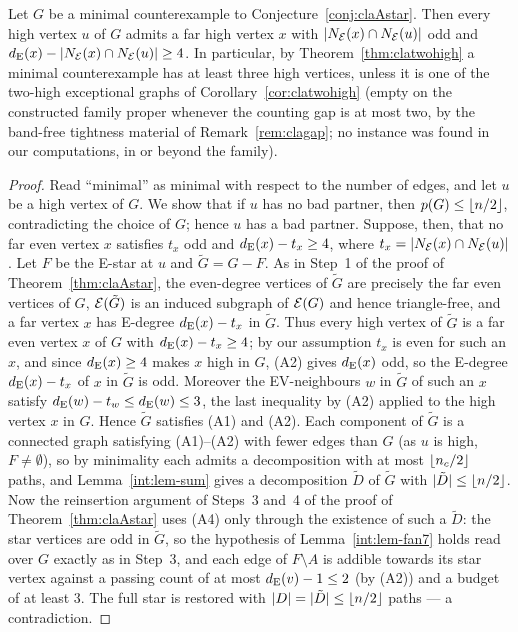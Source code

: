 \begin{proposition}\label{prop:claresidue}
Let $G$ be a minimal counterexample to Conjecture~\ref{conj:claAstar}.
Then every high vertex $u$ of $G$ admits a far high vertex $x$ with
$|N_{\mathcal{E}}(x)\cap N_{\mathcal{E}}(u)|$ odd and
$d_{\mathrm{E}}(x)-|N_{\mathcal{E}}(x)\cap N_{\mathcal{E}}(u)|\ge4$. In particular, by
Theorem~\ref{thm:clatwohigh} a minimal counterexample has at least three
high vertices, unless it is one of the two-high exceptional graphs of
Corollary~\ref{cor:clatwohigh} (empty on the constructed family proper
whenever the counting gap is at most two, by the band-free tightness
material of Remark~\ref{rem:clagap}; no instance was found in our
computations, in or beyond the family).
\end{proposition}
\begin{proof}
Read ``minimal'' as minimal with respect to the number of edges, and let
$u$ be a high vertex of $G$. We show that if $u$ has no bad partner, then
$p(G)\le\left\lfloor n/2 \right\rfloor$, contradicting the choice of $G$; hence $u$ has a
bad partner. Suppose, then, that no far even vertex $x$ satisfies $t_x$
odd and $d_{\mathrm{E}}(x)-t_x\ge4$, where $t_x=|N_{\mathcal{E}}(x)\cap N_{\mathcal{E}}(u)|$. Let
$F$ be the E-star at $u$ and $\tilde G=G-F$. As in Step~1 of the proof of
Theorem~\ref{thm:claAstar}, the even-degree vertices of $\tilde G$ are
precisely the far even vertices of $G$, $\mathcal{E}(\tilde G)$ is an induced
subgraph of $\mathcal{E}(G)$ and hence triangle-free, and a far vertex $x$ has
E-degree $d_{\mathrm{E}}(x)-t_x$ in $\tilde G$. Thus every high vertex of
$\tilde G$ is a far even vertex $x$ of $G$ with $d_{\mathrm{E}}(x)-t_x\ge4$; by our
assumption $t_x$ is even for such an $x$, and since $d_{\mathrm{E}}(x)\ge4$ makes
$x$ high in $G$, (A2) gives $d_{\mathrm{E}}(x)$ odd, so the E-degree
$d_{\mathrm{E}}(x)-t_x$ of $x$ in $\tilde G$ is odd. Moreover the EV-neighbours $w$
in $\tilde G$ of such an $x$ satisfy
$d_{\mathrm{E}}(w)-t_w\le d_{\mathrm{E}}(w)\le3$, the last inequality by (A2) applied to the
high vertex $x$ in $G$. Hence $\tilde G$ satisfies {\rm(A1)} and
{\rm(A2)}. Each component of $\tilde G$ is a connected graph satisfying
{\rm(A1)}--{\rm(A2)} with fewer edges than $G$ (as $u$ is high,
$F\neq\emptyset$), so by minimality each admits a decomposition with at
most $\left\lfloor n_c/2 \right\rfloor$ paths, and Lemma~\ref{int:lem-sum} gives a decomposition
$\tilde D$ of $\tilde G$ with $|\tilde D|\le\left\lfloor n/2 \right\rfloor$. Now the
reinsertion argument of Steps~3 and~4 of the proof of
Theorem~\ref{thm:claAstar} uses (A4) only through the existence of such a
$\tilde D$: the star vertices are odd in $\tilde G$, so the hypothesis of
Lemma~\ref{int:lem-fan7} holds read over $G$ exactly as in Step~3, and each
edge of $F\setminus A$ is addible towards its star vertex against a
passing count of at most $d_{\mathrm{E}}(v)-1\le2$ (by (A2)) and a budget of at
least $3$. The full star is restored with $|D|=|\tilde D|\le\left\lfloor n/2 \right\rfloor$
paths --- a contradiction.
\end{proof}

